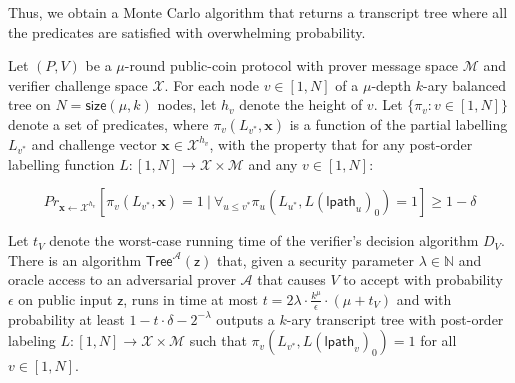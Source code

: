 Thus, we obtain a Monte Carlo algorithm that returns a transcript tree where all the predicates are satisfied with overwhelming probability. %

 
 \begin{lemma}\label{lem:ppfl}
 Let $(P, V)$ be a $\mu$-round public-coin protocol with prover message space $\mathcal{M}$ and verifier challenge space $\mathcal{X}$. For each node $v \in [1,N]$ of a $\mu$-depth $k$-ary balanced tree on $N = \textsf{size}(\mu, k)$ nodes, let $h_v$ denote the height of $v$. Let $\{\pi_v: v \in [1,N]\}$ denote a set of predicates, where $\pi_v(L_{v^*}, \mathbf{x})$ is a function of the partial labelling $L_{v^*}$ and challenge vector $\mathbf{x} \in \mathcal{X}^{h_v}$, with the property that for any post-order labelling function $L:[1,N] \rightarrow \mathcal{X} \times \mathcal{M}$ and any $v \in [1,N]$: 

$$Pr_{\mathbf{x} \leftarrow \mathcal{X}^{h_v}}[ \pi_v(L_{v^*}, \mathbf{x}) = 1 \ | \ \forall_{u \leq v^*} \pi_u(L_{u^*},L(\textsf{lpath}_u)_0) = 1] \geq 1 - \delta$$

Let $t_V$ denote the worst-case running time of the verifier's decision algorithm $D_V$. There is an algorithm $\textsf{Tree}^\mathcal{A}(\mathsf{z})$ that, given a security parameter $\lambda \in \mathbb{N}$ and oracle access to an adversarial prover $\mathcal{A}$ that causes $V$ to accept with probability $\epsilon$ on public input $\mathsf{z}$, runs in time at most $t = 2\lambda \cdot \frac{k^\mu}{\epsilon} \cdot (\mu + t_V)$ and with probability at least $1 - t \cdot\delta - 2^{-\lambda}$ outputs a $k$-ary transcript tree with post-order labeling $L:[1,N] \rightarrow \mathcal{X}\times \mathcal{M}$ such that $\pi_v(L_{v^*}, L(\textsf{lpath}_v)_0) = 1$ for all $v \in [1,N]$.  	
 \end{lemma}
 
